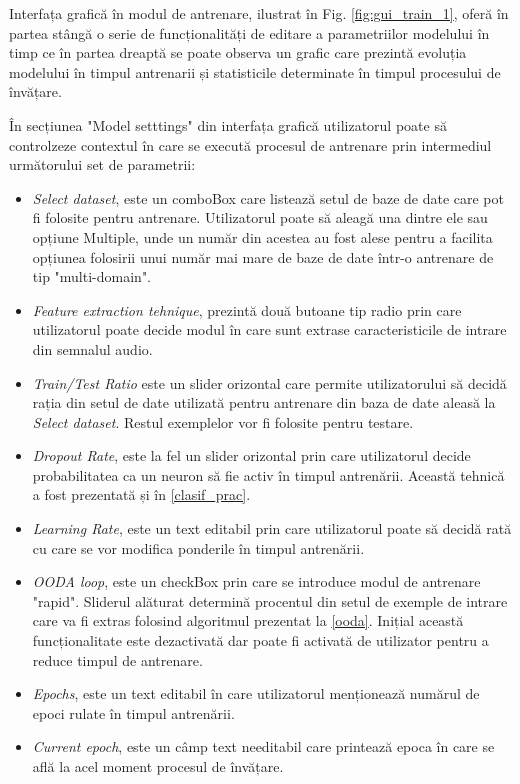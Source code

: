 \documentclass[a4paper,12pt]{book}
\begin{document}
		Interfața grafică în modul de antrenare, ilustrat în Fig. \ref{fig:gui_train_1}, oferă în partea stângă o serie de funcționalități de editare a parametriilor modelului în timp ce în partea dreaptă se poate observa un grafic care prezintă evoluția modelului în timpul antrenarii și statisticile determinate în timpul procesului de învățare. \par
		În secțiunea "Model setttings" din interfața grafică utilizatorul poate să controlzeze contextul în care se execută procesul de antrenare prin intermediul următorului set de parametrii:
		\begin{itemize}
			\setlength{\leftmargin}{-4cm}
			\item \textit{Select dataset}, este un comboBox care listează setul de baze de date care pot fi folosite pentru antrenare. Utilizatorul poate să aleagă una dintre ele sau opțiune Multiple, unde un număr din acestea au fost alese pentru a facilita opțiunea folosirii unui număr mai mare de baze de date într-o antrenare de tip "multi-domain".
			\item \textit{Feature extraction tehnique}, prezintă două butoane tip radio prin care utilizatorul poate decide modul în care sunt extrase caracteristicile de intrare din semnalul audio. 
			\item \textit{Train/Test Ratio} este un slider orizontal care permite utilizatorului să decidă rația din setul de date utilizată pentru antrenare din baza de date aleasă la \textit{Select dataset}. Restul exemplelor vor fi folosite pentru testare. 
			\item \textit{Dropout Rate}, este la fel un slider orizontal prin care utilizatorul decide probabilitatea ca un neuron să fie activ în timpul antrenării. Această tehnică a fost prezentată și în \ref{clasif_prac}. 
			\item \textit{Learning Rate}, este un text editabil prin care utilizatorul poate să decidă rată cu care se vor modifica ponderile în timpul antrenării. 
			\item \textit{OODA loop}, este un checkBox prin care se introduce modul de antrenare "rapid". Sliderul alăturat determină procentul din setul de exemple de intrare care va fi extras folosind algoritmul prezentat la \ref{ooda}. Inițial această funcționalitate este dezactivată dar poate fi activată de utilizator pentru a reduce timpul de antrenare. 
			\item \textit{Epochs}, este un text editabil în care utilizatorul menționează numărul de epoci rulate în timpul antrenării.
			\item \textit{Current epoch}, este un câmp text needitabil care printează epoca în care se află la acel moment procesul de învățare.			
		\end{itemize}
\end{document}
